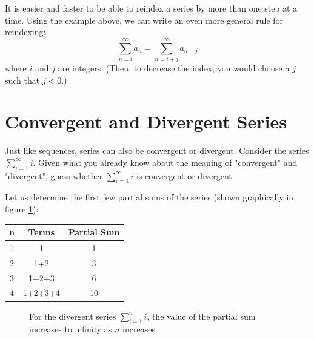 It is easier and faster to be able to reindex a series by more than one step 
at a time. Using the example above, we can write an even more general rule for 
reindexing:
$$\sum_{n=i}^\infty a_n = \sum_{n=i + j}^\infty a_{n - j}$$
where $i$ and $j$ are integers. (Then, to decrease the index, you would choose 
a $j$ such that $j < 0$.)

\section{Convergent and Divergent Series}
Just like sequences, series can also be convergent or divergent. 
Consider the series $\sum_{i=1}^\infty i$. Given what you already 
know about the meaning of "convergent" and "divergent", guess whether 
$\sum_{i=1}^\infty i$ is convergent or divergent. 

Let us determine the first few partial sums of the series (shown 
graphically in figure \ref{fig:divsum}):
\begin{center}
\begin{tabular}{|c|c|c|}\hline
n & Terms & Partial Sum\\
\hline
1 & 1 & 1\\
\hline
2 & 1+2 & 3\\
\hline
3 & 1+2+3 & 6\\
\hline
4 & 1+2+3+4 & 10\\
\hline
\end{tabular}
\end{center}

\begin{figure}[H]
\centering
    \caption{For the divergent series $\sum_{i=1}^n i$, the value of the 
    partial sum increases to infinity as $n$ increases}
    \label{fig:divsum}
\end{figure}


